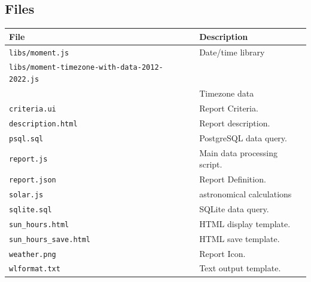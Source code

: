 \documentclass[a4paper,10pt]{book}
\newcommand{\partnumber}{\ifthenelse{\isundefined{\projectnum}}{}{\projectnum-\docnum	\ifthenelse{\equal{\docrev}{001}}{}{.\docrev}}}
\newcommand*\cleartoleftpage{%
  \clearpage
  \ifodd\value{page}\hbox{}\newpage\fi
}
\begin{document}
\subsection{Files}
\begin{tabular}{p{3.8cm} p{10cm}}
\hline
\textbf{File} & \textbf{Description} \\
\hline
\verb|libs/moment.js| & Date/time library\\
\verb|libs/moment-timezone-with-data-2012-2022.js| & \\
& Timezone data \\
\verb|criteria.ui| & Report Criteria.\\
\verb|description.html| & Report description. \\
\verb|psql.sql| & PostgreSQL data query.\\
\verb|report.js| & Main data processing script. \\
\verb|report.json| & Report Definition.\\
\verb|solar.js| & astronomical calculations \\
\verb|sqlite.sql| & SQLite data query. \\
\verb|sun_hours.html| & HTML display template.\\
\verb|sun_hours_save.html| & HTML save template.\\
\verb|weather.png| & Report Icon.\\
\verb|wlformat.txt| & Text output template.\\
\hline
\end{tabular}



\cleartoleftpage
\thispagestyle{empty}
\begin{flushright}
\null
\vfill
\tt \partnumber
\end{flushright}
\end{document}
